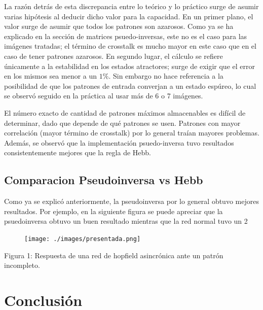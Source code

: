 \documentclass[%
    final,
    reprint,
    notitlepage,
    narroweqnarray,
    inline,
    twoside,
    invited
    ]{ieee}
\begin{document}
\par La razón detrás de esta discrepancia entre lo teórico y lo práctico surge de asumir varias hipótesis al deducir dicho valor para la capacidad. En un primer plano, el valor surge de asumir que todos los patrones son azarosos. Como ya se ha explicado en la sección de matrices psuedo-inversas, este no es el caso para las imágenes tratadas; el término de crosstalk es mucho mayor en este caso que en el caso de tener patrones azarosos. En segundo lugar, el cálculo se refiere únicamente a la estabilidad en los estados atractores; surge de exigir que el error en los mismos sea menor a un $1\%$. Sin embargo no hace referencia a la posibilidad de que los patrones de entrada converjan a un estado espúreo, lo cual se observó seguido en la práctica al usar más de 6 o 7 imágenes.\\

\par El número exacto de cantidad de patrones máximos almacenables es difícil de determinar, dado que depende de qué patrones se usen. Patrones con mayor correlación (mayor término de crosstalk) por lo general traían mayores problemas. Además, se observó que la implementación psuedo-inversa tuvo resultados consistentemente mejores que la regla de Hebb.

\subsection{Comparacion Pseudoinversa vs Hebb}

Como ya se explicó anteriormente, la pseudoinversa por lo general obtuvo mejores resultados. Por ejemplo, en la siguiente figura 
se puede apreciar que la psuedoinversa obtuvo un buen resultado mientras que la red normal tuvo un 2%

\begin{figure}[H]
\begin{center}
\texttt{[image: ./images/presentada.png]}
\label{modelado}
\end{center}
\end{figure}

\begin{center}
\par Figura 1: Respuesta de una red de hopfield asincrónica ante un patrón incompleto.
\end{center}


\section{Conclusión}
\end{document}
